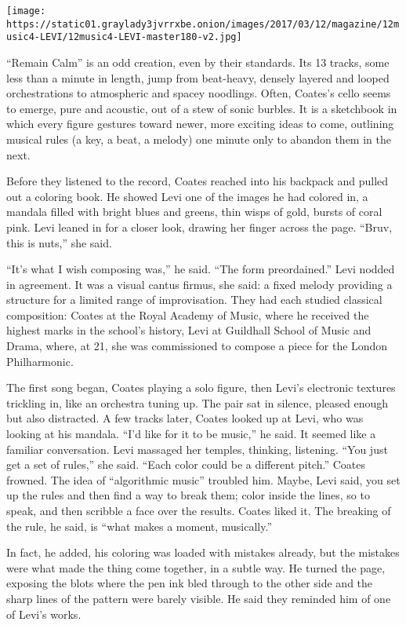 \texttt{[image: https://static01.graylady3jvrrxbe.onion/images/2017/03/12/magazine/12music4-LEVI/12music4-LEVI-master180-v2.jpg]}

``Remain Calm'' is an odd creation, even by their standards. Its 13
tracks, some less than a minute in length, jump from beat-heavy, densely
layered and looped orchestrations to atmospheric and spacey noodlings.
Often, Coates's cello seems to emerge, pure and acoustic, out of a stew
of sonic burbles. It is a sketchbook in which every figure gestures
toward newer, more exciting ideas to come, outlining musical rules (a
key, a beat, a melody) one minute only to abandon them in the next.

Before they listened to the record, Coates reached into his backpack and
pulled out a coloring book. He showed Levi one of the images he had
colored in, a mandala filled with bright blues and greens, thin wisps of
gold, bursts of coral pink. Levi leaned in for a closer look, drawing
her finger across the page. ``Bruv, this is nuts,'' she said.

``It's what I wish composing was,'' he said. ``The form preordained.''
Levi nodded in agreement. It was a visual cantus firmus, she said: a
fixed melody providing a structure for a limited range of improvisation.
They had each studied classical composition: Coates at the Royal Academy
of Music, where he received the highest marks in the school's history,
Levi at Guildhall School of Music and Drama, where, at 21, she was
commissioned to compose a piece for the London Philharmonic.

The first song began, Coates playing a solo figure, then Levi's
electronic textures trickling in, like an orchestra tuning up. The pair
sat in silence, pleased enough but also distracted. A few tracks later,
Coates looked up at Levi, who was looking at his mandala. ``I'd like for
it to be music,'' he said. It seemed like a familiar conversation. Levi
massaged her temples, thinking, listening. ``You just get a set of
rules,'' she said. ``Each color could be a different pitch.'' Coates
frowned. The idea of ``algorithmic music'' troubled him. Maybe, Levi
said, you set up the rules and then find a way to break them; color
inside the lines, so to speak, and then scribble a face over the
results. Coates liked it. The breaking of the rule, he said, is ``what
makes a moment, musically.''

In fact, he added, his coloring was loaded with mistakes already, but
the mistakes were what made the thing come together, in a subtle way. He
turned the page, exposing the blots where the pen ink bled through to
the other side and the sharp lines of the pattern were barely visible.
He said they reminded him of one of Levi's works.

